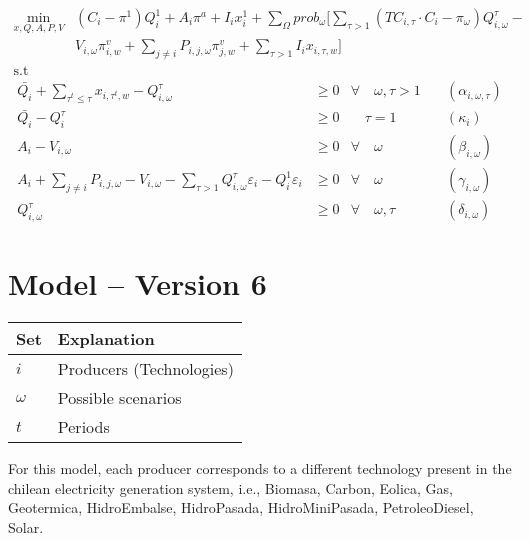 \documentclass[11pt, letterpaper]{article}
\begin{document}
\begin{align}
    \min_{x,Q,A,P,V} & (C_i-\pi^{1}) Q_i^{1} + A_i \pi^{a} + I_i x_i^{1} + \sum_{\Omega} prob_\omega \Big[ \sum_{\tau>1} (TC_{i,\tau}\cdot C_i-\pi_{\omega}) Q_{i,\omega}^{\tau}- \nonumber \\ 
    &V_{i,\omega}\pi_{i,w}^v+\sum_{j\neq i}  P_{i,j,\omega}\pi_{j,w}^v+ \sum_{\tau > 1} I_ix_{i,\tau,w}\Big]\\
     \textrm{s.t \ } \nonumber
\end{align}
\begin{align}
    \bar{Q_i} + \sum_{\tau^{t}\leq\tau} x_{i,\tau^{t},w} - Q_{i,\omega}^{\tau} & \geq 0  & \forall  \quad \omega, \tau  > 1 & \quad (\alpha_{i,\omega,\tau})\\
    \bar{Q_i}-Q_{i}^{\tau} & \geq 0  &  \quad \tau  =1 & \quad (\kappa_i) \\
 A_{i} -V_{i,\omega} & \geq  0  & \forall  \quad \omega & \quad (\beta_{i,\omega})\\
 A_{i} + \sum_{j \neq i}P_{i,j,\omega} - V_{i,\omega}-\sum_{\tau>1}Q_{i, \omega}^{\tau}\varepsilon_{i}-Q_i^{1}\varepsilon_{i} & \geq  0  &\forall \quad \omega & \quad (\gamma_{i,\omega})\\
 Q_{i, \omega}^{\tau} & \geq  0   & \forall  \quad \omega, \tau & \quad (\delta_{i,\omega})
\end{align}


\section{Model -- Version 6}


\begin{center}
\begin{tabular}{ l l  } 
 \hline
 \textbf{Set} &  \textbf{Explanation} \\ 
 \hline
 \hline
 $i$ & Producers (Technologies) \\  
 $\omega$ & Possible scenarios \\ 
 $t$ & Periods \\
 \hline
\end{tabular}
\end{center}

For this model, each producer corresponds to a different technology present in the chilean electricity generation system, i.e., Biomasa, Carbon, Eolica, Gas, Geotermica, HidroEmbalse, HidroPasada, HidroMiniPasada, PetroleoDiesel, Solar.
\end{document}
